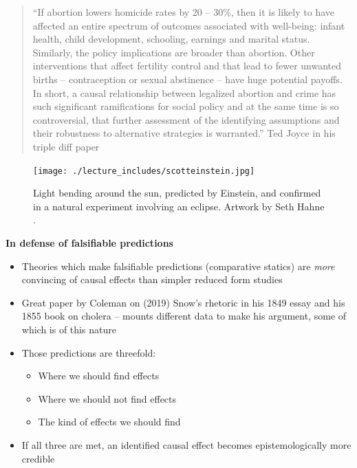 \documentclass[notes=show]{beamer}
\begin{document}
\begin{frame}[plain]

\begin{quote}
``If abortion lowers homicide rates by 20 -- 30\%, then it is likely to have affected an
entire spectrum of outcomes associated with well-being: infant health, child development,
schooling, earnings and marital status. Similarly, the policy implications are
broader than abortion. Other interventions that affect fertility control and that lead
to fewer unwanted births -- contraception or sexual abstinence -- have huge potential
payoffs. In short, a causal relationship between legalized abortion and crime has
such significant ramifications for social policy and at the same time is so controversial,
that further assessment of the identifying assumptions and their robustness to
alternative strategies is warranted.'' Ted Joyce in his triple diff paper \end{quote}

\end{frame}


\begin{frame}[plain]

\begin{figure}[htb]
\centering
\texttt{[image: ./lecture\_includes/scotteinstein.jpg]}
\caption{Light bending around the sun, predicted by Einstein, and confirmed in a natural experiment involving an eclipse. Artwork by Seth Hahne \textcopyright.}
\end{figure}

\end{frame}

\begin{frame}[plain]
\begin{center}
\textbf{In defense of falsifiable predictions}
\end{center}

\begin{itemize}
\item Theories which make falsifiable predictions (comparative statics) are \emph{more} convincing of causal effects than simpler reduced form studies
\item Great paper by Coleman on (2019) Snow's rhetoric in his 1849 essay and his 1855 book on cholera -- mounts different data to make his argument, some of which is of this nature
\item Those predictions are threefold:
	\begin{itemize}
	\item Where we should find effects
	\item Where we should not find effects
	\item The kind of effects we should find
	\end{itemize}
\item If all three are met, an identified causal effect becomes epistemologically more credible
\end{itemize}

\end{frame}
\end{document}
